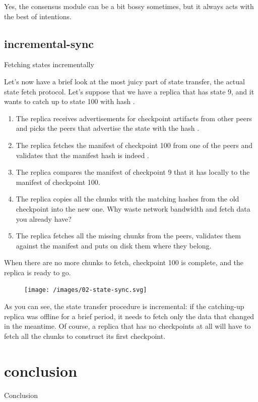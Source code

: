 \documentclass{article}
\begin{document}
Yes, the consensus module can be a bit bossy sometimes, but it always acts with the best of intentions.

\subsection{incremental-sync}{Fetching states incrementally}

Let's now have a brief look at the most juicy part of state transfer, the actual state fetch protocol.
Let's suppose that we have a replica that has state 9, and it wants to catch up to state 100 with hash .
\begin{enumerate}
\item The replica receives advertisements for checkpoint artifacts from other peers and picks the peers that advertise the state with the hash .
\item The replica fetches the manifest of checkpoint 100 from one of the peers and validates that the manifest hash is indeed .
\item The replica compares the manifest of checkpoint 9 that it has locally to the manifest of checkpoint 100.
\item 
  The replica copies all the chunks with the matching hashes from the old checkpoint into the new one.
  Why waste network bandwidth and fetch data you already have?
\item The replica fetches all the missing chunks from the peers, validates them against the manifest and puts on disk them where they belong.
\end{enumerate}

When there are no more chunks to fetch, checkpoint 100 is complete, and the replica is ready to go.

\begin{figure}[grayscale-diagram]
\texttt{[image: /images/02-state-sync.svg]}
\end{figure}

As you can see, the state transfer procedure is incremental: if the catching-up replica was offline for a brief period, it needs to fetch only the data that changed in the meantime.
Of course, a replica that has no checkpoints at all will have to fetch all the chunks to construct its first checkpoint.

\section{conclusion}{Conclusion}
\end{document}
